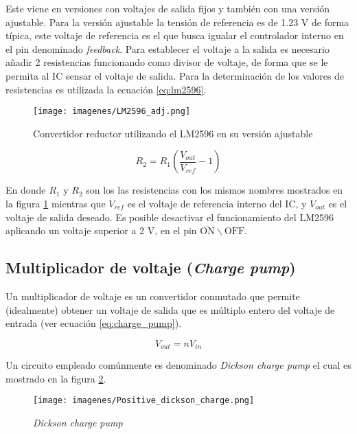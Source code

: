  Este viene en versiones con voltajes de 
 salida fijos y también con una versión ajustable.  Para la versión ajustable la tensión de
 referencia es de 1.23 V de forma típica, este voltaje de referencia es el que busca igualar
 el controlador interno en el pin denominado \textit{feedback}. Para establecer el voltaje
 a la salida es necesario añadir 2 resistencias funcionando como divisor de voltaje, 
 de forma que se le permita al IC sensar el voltaje de salida. Para la determinación de los
valores de resistencias es utilizada la ecuación \ref{eq:lm2596}. 

 \begin{figure}[H]
    \centering
    \texttt{[image: imagenes/LM2596\_adj.png]}
    \caption{Convertidor reductor utilizando el LM2596 en su versión ajustable \cite{lm2596}}
    \label{fig:lm2596}
 \end{figure}
 
\begin{equation}
    R_2 = R_1(\frac{V_{out}}{V_{ref}} - 1)
    \label{eq:lm2596}
\end{equation}

En donde $R_1$ y $R_2$ son los las resistencias con los mismos nombres mostrados en la
figura \ref{fig:lm2596} mientras que $V_{ref}$ es el voltaje de referencia interno del
IC, y $V_{out}$ es el voltaje de salida deseado. Es posible desactivar el funcionamiento
del LM2596 aplicando un voltaje superior a 2 V, en el pin 
$\overline{\text{ON}}\backslash\text{OFF}$.

\subsection{Multiplicador de voltaje (\textit{Charge pump})}
    \label{sec:charge_pump}
    Un multiplicador de voltaje es un convertidor conmutado que permite (idealmente)
    obtener un voltaje de salida que es múltiplo entero del voltaje de entrada
    (ver ecuación \ref{eq:charge_pump}).
    
    \begin{equation}
        V_{out} = n V_{in}
        \label{eq:charge_pump}
    \end{equation}
    
    Un circuito empleado comúnmente es denominado \textit{
    Dickson charge pump} el cual es mostrado en la figura \ref{fig:dickson_charge}.
    
    \begin{figure}[H]
        \centering
        \texttt{[image: imagenes/Positive\_dickson\_charge.png]}
        \caption{\textit{ Dickson charge pump} \cite{charge_dikson}}
        \label{fig:dickson_charge}
    \end{figure}

